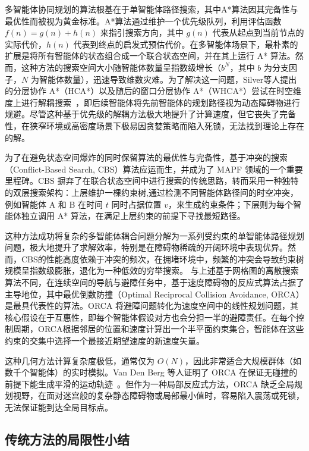 \documentclass[13.5pt]{extarticle}
\begin{document}
多智能体协同规划的算法根基在于单智能体路径搜索，其中A*算法因其完备性与最优性而被视为黄金标准。A*算法通过维护一个优先级队列，利用评估函数 $f(n) = g(n) + h(n)$ 来指引搜索方向，其中 $g(n)$ 代表从起点到当前节点的实际代价，$h(n)$ 代表到终点的启发式预估代价。在多智能体场景下，最朴素的扩展是将所有智能体的状态组合成一个联合状态空间，并在其上运行 A* 算法。然而，这种方法的搜索空间大小随智能体数量呈指数级增长（$b^{N}$，其中 $b$ 为分支因子，$N$ 为智能体数量），迅速导致维数灾难。为了解决这一问题，Silver等人提出的分层协作 A*（HCA*）以及随后的窗口分层协作 A*（WHCA*）尝试在时空维度上进行解耦搜索~\cite{silver2005cooperative}，即后续智能体将先前智能体的规划路径视为动态障碍物进行规避。尽管这种基于优先级的解耦方法极大地提升了计算速度，但它丧失了完备性，在狭窄环境或高密度场景下极易因贪婪策略而陷入死锁，无法找到理论上存在的解。

为了在避免状态空间爆炸的同时保留算法的最优性与完备性，基于冲突的搜索（Conflict-Based Search, CBS）算法应运而生，并成为了 MAPF 领域的一个重要里程碑。CBS 摒弃了在联合状态空间中进行搜索的传统思路，转而采用一种独特的双层搜索架构：上层维护一棵约束树,通过检测不同智能体路径间的时空冲突，例如智能体 A 和 B 在时间 $t$ 同时占据位置 $v$，来生成约束条件；下层则为每个智能体独立调用 A* 算法，在满足上层约束的前提下寻找最短路径。

这种方法成功将复杂的多智能体耦合问题分解为一系列受约束的单智能体路径规划问题，极大地提升了求解效率，特别是在障碍物稀疏的开阔环境中表现优异。然而，CBS的性能高度依赖于冲突的频次，在拥堵环境中，频繁的冲突会导致约束树规模呈指数级膨胀，退化为一种低效的穷举搜索。
与上述基于网格图的离散搜索算法不同，在连续空间的导航与避障任务中，基于速度障碍物的反应式算法占据了主导地位，其中最优倒数防撞（Optimal Reciprocal Collision Avoidance, ORCA）是最具代表性的算法。ORCA 将避障问题转化为速度空间中的线性规划问题，其核心假设在于互惠性，即每个智能体假设对方也会分担一半的避障责任。在每个控制周期，ORCA根据邻居的位置和速度计算出一个半平面约束集合，智能体在这些约束的交集中选择一个最接近期望速度的新速度矢量。

这种几何方法计算复杂度极低，通常仅为 $O(N)$，因此非常适合大规模群体（如数千个智能体）的实时模拟。Van Den Berg 等人证明了 ORCA 在保证无碰撞的前提下能生成平滑的运动轨迹~\cite{sharon2015conflict}。但作为一种局部反应式方法，ORCA 缺乏全局规划视野，在面对迷宫般的复杂静态障碍物或局部最小值时，容易陷入震荡或死锁，无法保证能到达全局目标点。

\subsection{传统方法的局限性小结}
\end{document}
